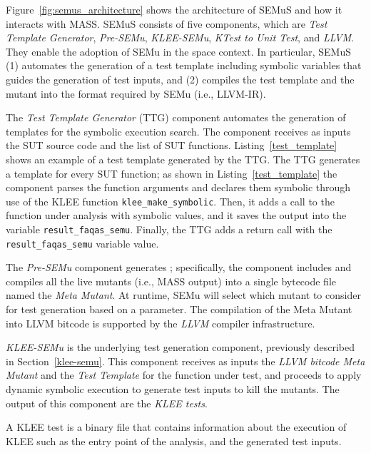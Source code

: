 

Figure~\ref{fig:semus_architecture} shows the architecture of SEMuS and how it interacts with MASS. SEMuS consists of five components, which are \emph{Test Template Generator},  \emph{Pre-SEMu},  \emph{KLEE-SEMu},  \emph{KTest to Unit Test}, and \emph{LLVM}.
They enable the adoption of SEMu in the space context. In particular, SEMuS (1) automates the generation of a test template including symbolic variables that guides the generation of test inputs, and (2) compiles the test template and the mutant into the format required by SEMu (i.e., LLVM-IR). 


The \emph{Test Template Generator} (TTG) component automates the generation of templates for the symbolic execution search. The component receives as inputs the SUT source code and the list of SUT functions. 
Listing~\ref{test_template} shows an example of a test template generated by the TTG. The TTG generates a template for every SUT function; as shown in Listing~\ref{test_template} the component parses the function arguments and declares them symbolic through use of the KLEE function \texttt{klee\_make\_symbolic}. Then, it adds a call to the function under analysis with symbolic values, and it saves the output into the variable \texttt{result\_faqas\_semu}. Finally, the TTG adds a return call with the \texttt{result\_faqas\_semu} variable value.

The \emph{Pre-SEMu} component generates ; specifically, the component includes and compiles all the live mutants (i.e., MASS output) into a single bytecode file named the \emph{Meta Mutant}. At runtime, SEMu will select which mutant to consider for test generation based on a parameter. The compilation of the Meta Mutant into LLVM bitcode is supported by the \emph{LLVM} compiler infrastructure. 




\emph{KLEE-SEMu} is the underlying test generation component, previously described in Section~\ref{klee-semu}. This component receives as inputs the \emph{LLVM bitcode Meta Mutant} and the \emph{Test Template} for the function under test, and proceeds to apply dynamic symbolic execution to generate test inputs to kill the mutants. The output of this component are the \emph{KLEE tests}.

A KLEE test is a binary file that contains information about the execution of KLEE such as the entry point of the analysis, and the generated test inputs.


